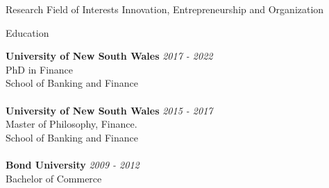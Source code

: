 \documentclass{resume} %
\begin{document}

\begin{rSection}{Research Field of Interests}
	Innovation, Entrepreneurship and Organization

\end{rSection}
\begin{rSection}{Education}

	{\bf University of New South Wales} \hfill {\em 2017 - 2022}
	\\ PhD in Finance
	\\ School of Banking and Finance\\
	\\{\bf University of New South Wales} \hfill {\em 2015 - 2017}
	\\ Master of Philosophy, Finance.
	\\ School of Banking and Finance
	\\
	\\{\bf Bond University} \hfill {\em 2009 - 2012}
	\\ Bachelor of Commerce
\end{rSection}
\end{document}
